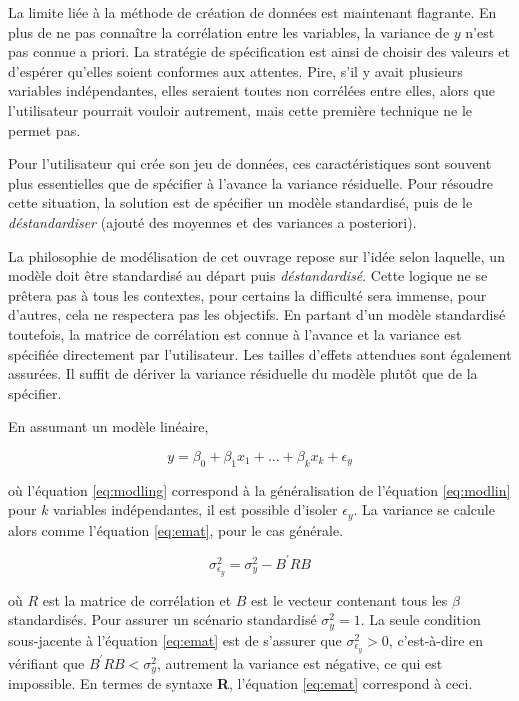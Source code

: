 \documentclass[
]{book}
\begin{document}
La limite liée à la méthode de création de données est maintenant flagrante. En plus de ne pas connaître la corrélation entre les variables, la variance de \(y\) n'est pas connue a priori. La stratégie de spécification est ainsi de choisir des valeurs et d'espérer qu'elles soient conformes aux attentes. Pire, s'il y avait plusieurs variables indépendantes, elles seraient toutes non corrélées entre elles, alors que l'utilisateur pourrait vouloir autrement, mais cette première technique ne le permet pas.

Pour l'utilisateur qui crée son jeu de données, ces caractéristiques sont souvent plus essentielles que de spécifier à l'avance la variance résiduelle. Pour résoudre cette situation, la solution est de spécifier un modèle standardisé, puis de le \emph{déstandardiser} (ajouté des moyennes et des variances a posteriori).

La philosophie de modélisation de cet ouvrage repose sur l'idée selon laquelle, un modèle doit être standardisé au départ puis \emph{déstandardisé}. Cette logique ne se prêtera pas à tous les contextes, pour certains la difficulté sera immense, pour d'autres, cela ne respectera pas les objectifs. En partant d'un modèle standardisé toutefois, la matrice de corrélation est connue à l'avance et la variance est spécifiée directement par l'utilisateur. Les tailles d'effets attendues sont également assurées. Il suffit de dériver la variance résiduelle du modèle plutôt que de la spécifier.

En assumant un modèle linéaire,

\begin{equation}
y = \beta_0 + \beta_1 x_1 + ... +\beta_k x_k + \epsilon_y
\label{eq:modling}
\end{equation}

où l'équation \eqref{eq:modling} correspond à la généralisation de l'équation \eqref{eq:modlin} pour \(k\) variables indépendantes, il est possible d'isoler \(\epsilon_y\). La variance se calcule alors comme l'équation \eqref{eq:emat}, pour le cas générale.

\begin{equation}
\sigma^2_{\epsilon_y} = \sigma^2_y - B^{\prime}RB
\label{eq:emat}
\end{equation}

où \(R\) est la matrice de corrélation et \(B\) est le vecteur contenant tous les \(\beta\) standardisés. Pour assurer un scénario standardisé \(\sigma^2_y = 1\). La seule condition sous-jacente à l'équation \eqref{eq:emat} est de s'assurer que \(\sigma^2_{\epsilon_y} > 0\), c'est-à-dire en vérifiant que \(B^{\prime}RB < \sigma^2_y\), autrement la variance est négative, ce qui est impossible. En termes de syntaxe \textbf{R}, l'équation \eqref{eq:emat} correspond à ceci.
\end{document}
